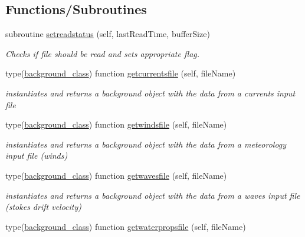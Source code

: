 \subsection*{Functions/\+Subroutines}
\begin{DoxyCompactItemize}
\item 
subroutine \mbox{\hyperlink{namespacesimulationinputstreamer__mod_a9ebef1f85eeb213cf69ea18ca012e047}{setreadstatus}} (self, last\+Read\+Time, buffer\+Size)
\begin{DoxyCompactList}\small\item\em Checks if file should be read and sets appropriate flag. \end{DoxyCompactList}\item 
type(\mbox{\hyperlink{structbackground__mod_1_1background__class}{background\+\_\+class}}) function \mbox{\hyperlink{namespacesimulationinputstreamer__mod_af1f989baa363031aac274694aeacfad5}{getcurrentsfile}} (self, file\+Name)
\begin{DoxyCompactList}\small\item\em instantiates and returns a background object with the data from a currents input file \end{DoxyCompactList}\item 
type(\mbox{\hyperlink{structbackground__mod_1_1background__class}{background\+\_\+class}}) function \mbox{\hyperlink{namespacesimulationinputstreamer__mod_ac69aeed5ee36930444f6e5389071994e}{getwindsfile}} (self, file\+Name)
\begin{DoxyCompactList}\small\item\em instantiates and returns a background object with the data from a meteorology input file (winds) \end{DoxyCompactList}\item 
type(\mbox{\hyperlink{structbackground__mod_1_1background__class}{background\+\_\+class}}) function \mbox{\hyperlink{namespacesimulationinputstreamer__mod_a28ca430c32786d6df906f295bedf54df}{getwavesfile}} (self, file\+Name)
\begin{DoxyCompactList}\small\item\em instantiates and returns a background object with the data from a waves input file (stokes drift velocity) \end{DoxyCompactList}\item 
type(\mbox{\hyperlink{structbackground__mod_1_1background__class}{background\+\_\+class}}) function \mbox{\hyperlink{namespacesimulationinputstreamer__mod_a7e82619f63c76454a4ea97e3a0b4bc48}{getwaterpropsfile}} (self, file\+Name)

\end{DoxyCompactItemize}
